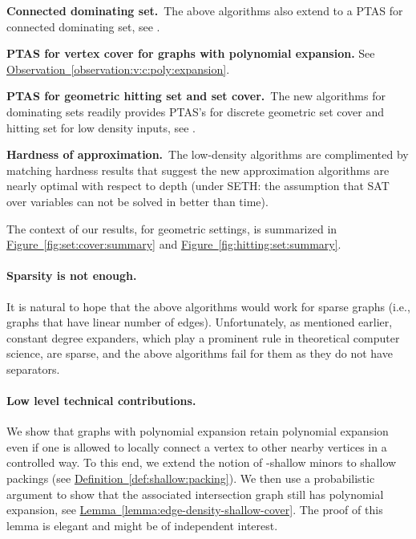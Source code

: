 \documentclass[12pt]{article}
\newcommand{\Term}[1]{\textsf{#1}}
\theoremstyle{remark}\theoremheaderfont{\sf}\theorembodyfont{\upshape}
\numberwithin{figure}{section}\numberwithin{table}{section}\numberwithin{equation}{section}
\newcommand{\HLink}[2]{\hyperref[#2]{#1~\ref*{#2}}}
\newcommand{\figref}[1]{\HLink{Figure}{fig:#1}}
\newcommand{\defref}[1]{\HLink{Definition}{def:#1}}
\newcommand{\lemref}[1]{\HLink{Lemma}{lemma:#1}}
\newcommand{\obsref}[1]{\HLink{Observation}{observation:#1}}
\newcommand{\SETH}{\Term{SETH}\xspace}
\newcommand{\ProblemC}[1]{\textsf{#1}}
\newcommand{\PTAS}{\Term{PTAS}\xspace}
\begin{document}
\begin{compactenum}[(A)]
\item \textbf{Connected dominating set.}~The above algorithms also extend to a \PTAS for connected dominating
  set, see .

\item \textbf{\PTAS for vertex cover for graphs with polynomial
    expansion.} See \obsref{v:c:poly:expansion}.


\item \textbf{\PTAS for geometric hitting set and set cover.}~The new algorithms for dominating sets readily provides \PTAS's for
  discrete geometric set cover and hitting set for low density inputs,
  see .

\item \textbf{Hardness of approximation.}~The low-density algorithms
  are complimented by matching hardness results that suggest the new
  approximation algorithms are nearly optimal with respect to depth
  (under \SETH: the assumption that \ProblemC{SAT} over  variables
  can not be solved in better than  time).
\end{compactenum}
\smallskip The context of our results, for geometric settings, is summarized in
\figref{set:cover:summary} and \figref{hitting:set:summary}.

\paragraph{Sparsity is not enough.}

It is natural to hope that the above algorithms would work for sparse
graphs (i.e., graphs that have linear number of edges). Unfortunately,
as mentioned earlier, constant degree expanders, which play a
prominent rule in theoretical computer science, are sparse, and the
above algorithms fail for them as they do not have separators.

\paragraph{Low level technical contributions.}

We show that graphs with polynomial expansion retain polynomial
expansion even if one is allowed to locally connect a vertex to other
nearby vertices in a controlled way. To this end, we extend the notion
of -shallow minors to shallow packings (see
\defref{shallow:packing}). We then use a probabilistic argument to
show that the associated intersection graph still has polynomial
expansion, see \lemref{edge-density-shallow-cover}. The proof of this
lemma is elegant and might be of independent interest.
\end{document}
